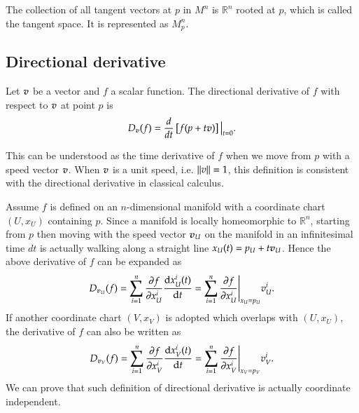 \documentclass[11pt, a4paper]{book}
\begin{document}
\begin{Definition}
  The collection of all tangent vectors at $p$ in $M^n$ is $\mathbb{R}^n$ rooted at $p$,
  which is called the tangent space. It is represented as $M_p^n$.
\end{Definition}

\subsection{Directional derivative}
\label{sec:directional-derivative}

\begin{Definition}
  Let $\boldsymbol{v}$ be a vector and $f$ a scalar function. The directional derivative of $f$
  with respect to $\boldsymbol{v}$ at point $p$ is
  \begin{equation}
    \label{eq:directional-derivative-wrt-v}
    D_{\boldsymbol{v}}(f) = \frac{d}{dt} \left[ f(p + t\boldsymbol{v}) \right] \big\vert_{t=0}.
  \end{equation}
\end{Definition}
This can be understood as the time derivative of $f$ when we move from $p$ with a speed
vector $\boldsymbol{v}$. When $\boldsymbol{v}$ is a unit speed, i.e. $\lVert v\rVert=1$, this definition is
consistent with the directional derivative in classical calculus.

Assume $f$ is defined on an $n$-dimensional manifold with a coordinate chart $(U, x_{U})$
containing $p$. Since a manifold is locally homeomorphic to $\mathbb{R}^n$, starting from
$p$ then moving with the speed vector $\boldsymbol{v}_U$ on the manifold in an infinitesimal
time $dt$ is actually walking along a straight line $x_U(t) = p_U+t\boldsymbol{v}_U$. Hence
the above derivative of $f$ can be expanded as
\begin{equation}
  \label{eq:df-in-xu}
  D_{\boldsymbol{v}_U}(f) = \sum_{i=1}^n \frac{\partial f}{\partial x_U^i} \frac{\mathrm{d}
    x_{U}^i(t)}{\mathrm{d} t} = \sum_{i=1}^n \frac{\partial f}{\partial x_U^i}\Bigg\vert_{x_U=p_U} v_U^i.
\end{equation}
If another coordinate chart $(V, x_V)$ is adopted which overlaps with $(U,x_U)$, the
derivative of $f$ can also be written as
\begin{equation}
  \label{eq:df-in-xv}
  D_{\boldsymbol{v}_V}(f) = \sum_{i=1}^n \frac{\partial f}{\partial x_V^i} \frac{\mathrm{d}
    x_{V}^i(t)}{\mathrm{d} t} = \sum_{i=1}^n \frac{\partial f}{\partial x_V^i} \Bigg\vert_{x_V=p_V} v_V^i.
\end{equation}
We can prove that such definition of directional derivative is actually coordinate
independent.
\end{document}
